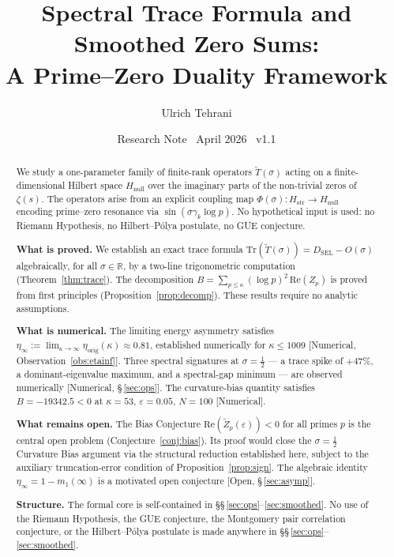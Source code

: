 \documentclass[11pt]{article}
\title{\vspace{-1.5em}\bfseries Spectral Trace Formula and Smoothed Zero Sums:\\[0.4em]
\large A Prime--Zero Duality Framework}
\author{Ulrich Tehrani}
\date{Research Note \textperiodcentered\ April 2026
      \textperiodcentered\ v1.1}
\newcommand{\Hstr}{H_{\mathrm{str}}}
\newcommand{\Hnull}{H_{\mathrm{null}}}
\newcommand{\etaorig}{\eta_{\mathrm{orig}}}
\newcommand{\Tt}{\widetilde{T}}
\newcommand{\Zt}{\widetilde{Z}}
\newcommand{\DSEL}{D_{\mathrm{SEL}}}
\begin{document}
\maketitle

\begin{abstract}
We study a one-parameter family of finite-rank operators $\Tt(\sigma)$
acting on a finite-dimensional Hilbert space $\Hnull$ over the imaginary
parts of the non-trivial zeros of $\zeta(s)$.
The operators arise from an explicit coupling map
$\Phi(\sigma)\colon\Hstr\to\Hnull$ encoding prime--zero resonance
via $\sin(\sigma\gamma_k\log p)$.
No hypothetical input is used: no Riemann Hypothesis, no Hilbert--P\'olya
postulate, no GUE conjecture.

\textbf{What is proved.}
We establish an exact trace formula
$\mathrm{Tr}(\Tt(\sigma)) = \DSEL - O(\sigma)$
algebraically, for all $\sigma\in\mathbb{R}$, by a two-line
trigonometric computation (Theorem~\ref{thm:trace}).
The decomposition $B = \sum_{p\leq\kappa}(\log p)^2\,\mathrm{Re}(Z_p)$
is proved from first principles (Proposition~\ref{prop:decomp}).
These results require no analytic assumptions.

\textbf{What is numerical.}
The limiting energy asymmetry satisfies
$\eta_\infty := \lim_{\kappa\to\infty}\etaorig(\kappa)\approx 0.81$,
established numerically for $\kappa\leq 1009$ [Numerical,
Observation~\ref{obs:etainf}].
Three spectral signatures at $\sigma=\tfrac{1}{2}$ --- a trace spike
of $+47\%$, a dominant-eigenvalue maximum, and a spectral-gap minimum
--- are observed numerically [Numerical, \S\,\ref{sec:ops}].
The curvature-bias quantity satisfies $B = -19342.5 < 0$
at $\kappa=53$, $\varepsilon=0.05$, $N=100$ [Numerical].

\textbf{What remains open.}
The Bias Conjecture $\mathrm{Re}(\Zt_p(\varepsilon))<0$
for all primes $p$ is the central open problem (Conjecture~\ref{conj:bias}).
Its proof would close the $\sigma=\tfrac{1}{2}$ Curvature Bias argument
via the structural reduction established here,
subject to the auxiliary truncation-error condition of
Proposition~\ref{prop:sign}.
The algebraic identity $\eta_\infty = 1 - m_1(\infty)$ is a motivated
open conjecture [Open, \S\,\ref{sec:asymp}].

\textbf{Structure.}
The formal core is self-contained in \S\S\,\ref{sec:ops}--\ref{sec:smoothed}.
No use of the Riemann Hypothesis, the GUE conjecture,
the Montgomery pair correlation conjecture, or the Hilbert--P\'olya
postulate is made anywhere in \S\S\,\ref{sec:ops}--\ref{sec:smoothed}.
\end{abstract}
\end{document}

